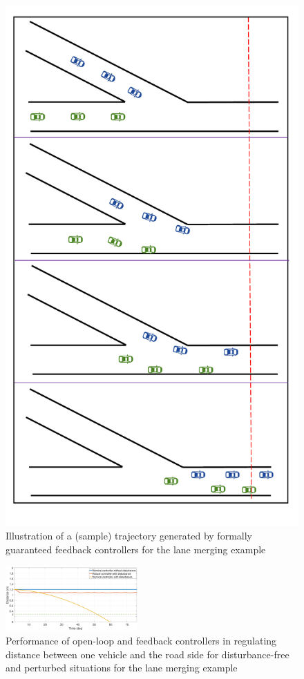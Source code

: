 \begin{figure}[t]
	\centering
	\includegraphics[scale=.21]{figures/merge.pdf}
	\caption{Illustration of a (sample) trajectory generated by formally guaranteed feedback controllers for the lane merging example}
	\label{fig:merge}
\end{figure}

\begin{figure}[t]
	\centering
	\includegraphics[width=0.45\textwidth]{figures/Merge_plot2.eps}
	\caption{Performance of open-loop and feedback controllers in regulating distance between one vehicle and the road side for disturbance-free and perturbed situations for the lane merging example}
	\label{fig:merging_distance}
\end{figure}


